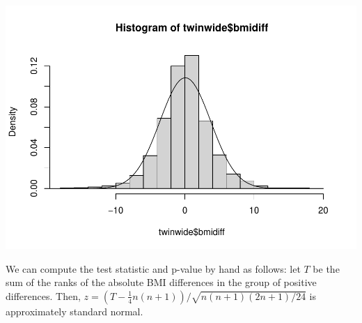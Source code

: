 \documentclass[
]{book}
\newenvironment{Shaded}{\begin{snugshade}}{\end{snugshade}}
\newcommand{\AttributeTok}[1]{\textcolor[rgb]{0.77,0.63,0.00}{#1}}
\newcommand{\ConstantTok}[1]{\textcolor[rgb]{0.00,0.00,0.00}{#1}}
\newcommand{\ControlFlowTok}[1]{\textcolor[rgb]{0.13,0.29,0.53}{\textbf{#1}}}
\newcommand{\DecValTok}[1]{\textcolor[rgb]{0.00,0.00,0.81}{#1}}
\newcommand{\FunctionTok}[1]{\textcolor[rgb]{0.00,0.00,0.00}{#1}}
\newcommand{\NormalTok}[1]{#1}
\newcommand{\OtherTok}[1]{\textcolor[rgb]{0.56,0.35,0.01}{#1}}
\newcommand{\SpecialCharTok}[1]{\textcolor[rgb]{0.00,0.00,0.00}{#1}}
\begin{document}
\begin{Shaded}
\end{Shaded}

\includegraphics{04-Non-Normal-Responses_files/figure-latex/unnamed-chunk-12-1.pdf}

We can compute the test statistic and p-value by hand as follows: let \(T\) be the sum of the ranks of the absolute BMI differences in the group of positive differences. Then, \(z = (T - \tfrac14n(n+1)) / \sqrt{n(n+1)(2n+1)/24}\) is approximately standard normal.
\end{document}
